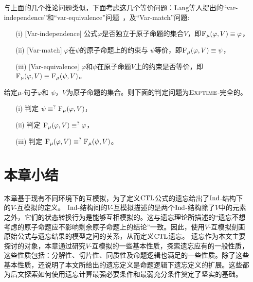 与上面的几个推论问题类似，下面考虑这几个等价问题：Lang等人提出的“var-independence”和“var-equivalence”问题~\cite{DBLP:journals/jair/LangLM03}，及“Var-match”问题:
\begin{itemize}
	\item[(i)] $[$Var-independence$]$ 公式$\varphi$是否独立于原子命题的集合$V$，即${\textsc{F}_{\textsc{$\mu$}}}(\varphi,V) \equiv \varphi$，
	\item[(ii)] $[$Var-match$]$  $\varphi$在$\psi$的原子命题上的约束与 $\psi$等价，即${\textsc{F}_{\textsc{$\mu$}}}(\varphi, V) \equiv \psi$，
	\item[(iii)] $[$Var-equivalence$]$  $\varphi$和$\psi$在原子命题$V$上的约束是否等价，即${\textsc{F}_{\textsc{$\mu$}}}(\varphi, V) \equiv {\textsc{F}_{\textsc{$\mu$}}}(\psi, V)$。
\end{itemize}

\begin{corollary}\label{chapter06:cor:equiv}
	给定$\mu$-句子$\varphi$和 $\psi$，$V$为原子命题的集合。则下面的判定问题为$\textsc{Exptime}$-完全的。
	\begin{itemize}
		\item[(i)] 判定 $\psi \equiv^?{\textsc{F}_{\textsc{$\mu$}}}(\varphi, V)$，
		\item[(ii)] 判定 ${\textsc{F}_{\textsc{$\mu$}}}(\varphi, V) \equiv^? \varphi$，
		\item[(iii)] 判定 ${\textsc{F}_{\textsc{$\mu$}}}(\varphi, V) \equiv^? {\textsc{F}_{\textsc{$\mu$}}}(\psi, V)$。
	\end{itemize}
\end{corollary}


\section{本章小结} 
本章基于现有不同环境下的互模拟，为了定义$\textrm{CTL}$公式的遗忘给出了$\textrm{Ind}$-结构下的$V$-互模拟的定义。
$\textrm{Ind}$-结构间的$V$-互模拟描述的是两个$\textrm{Ind}$-结构除了$V$中的元素之外，它们的状态转换行为是能够互相模拟的。这与遗忘理论所描述的“遗忘不想考虑的原子命题应不影响剩余原子命题上的结论”一致。因此，使用$V$-互模拟刻画原始公式与遗忘结果的模型之间的关系，从而定义$\textrm{CTL}$遗忘。
遗忘作为本文主要探讨的对象，本章通过研究$V$-互模拟的一些基本性质，探索遗忘应有的一般性质，这些性质包括：分解性、切片性、同质性及命题逻辑也满足的一些性质。除了这些基本性质，还说明了本文所给出的遗忘定义是命题逻辑下遗忘定义的扩展。这些都为后文探索如何使用遗忘计算最强必要条件和最弱充分条件奠定了坚实的基础。

